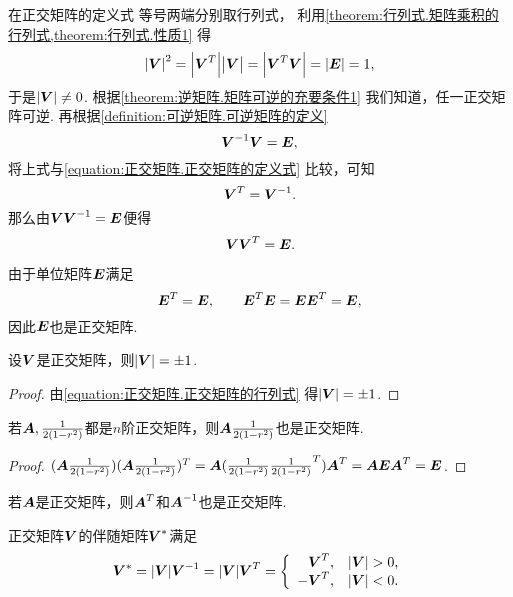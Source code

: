在正交矩阵的定义式  等号两端分别取行列式，
利用\cref{theorem:行列式.矩阵乘积的行列式,theorem:行列式.性质1} 得
\begin{equation}\label{equation:正交矩阵.正交矩阵的行列式}
	\abs{\Q}^2
	=\abs{\Q^T}\abs{\Q\vphantom{^T}}
	=\abs{\Q^T\Q}
	=\abs{\E}
	=1,
\end{equation}
于是\(\abs{\Q}\neq0\).
根据\cref{theorem:逆矩阵.矩阵可逆的充要条件1} 我们知道，任一正交矩阵可逆.
再根据\cref{definition:可逆矩阵.可逆矩阵的定义}\[
	\Q^{-1}\Q=\E,
\]
将上式与\cref{equation:正交矩阵.正交矩阵的定义式} 比较，可知\begin{equation}
	\Q^T=\Q^{-1}.
\end{equation}
那么由\(\Q\Q^{-1}=\E\)便得\begin{equation}
	\Q\Q^T=\E.
\end{equation}

\begin{example}
由于单位矩阵\(\boldsymbol{E}\)满足\[
	\boldsymbol{E}^T=\boldsymbol{E}, \qquad
	\boldsymbol{E}^T \boldsymbol{E} = \boldsymbol{E} \boldsymbol{E}^T = \boldsymbol{E},
\]
因此\(\boldsymbol{E}\)也是正交矩阵.
\end{example}

\begin{property}
设\(\Q\)是正交矩阵，则\(\abs{\Q} = \pm1\).
\begin{proof}
由\cref{equation:正交矩阵.正交矩阵的行列式}
得\(\abs{\Q} = \pm 1\).
\end{proof}
\end{property}

\begin{property}
若\(\boldsymbol{A},\frac{1}{2(1-r^2)}\)都是\(n\)阶正交矩阵，则\(\boldsymbol{A}\frac{1}{2(1-r^2)}\)也是正交矩阵.
\begin{proof}
\((\boldsymbol{A}\frac{1}{2(1-r^2)})(\boldsymbol{A}\frac{1}{2(1-r^2)})^T
= \boldsymbol{A}(\frac{1}{2(1-r^2)}\frac{1}{2(1-r^2)}^T)\boldsymbol{A}^T
= \boldsymbol{A}\boldsymbol{E}\boldsymbol{A}^T
= \boldsymbol{E}\).
\end{proof}
\end{property}

\begin{property}
若\(\boldsymbol{A}\)是正交矩阵，则\(\boldsymbol{A}^T\)和\(\boldsymbol{A}^{-1}\)也是正交矩阵.
\end{property}

\begin{theorem}
正交矩阵\(\Q\)的伴随矩阵\(\Q^*\)满足\[
	\Q^* = \abs{\Q} \Q^{-1}
	= \abs{\Q} \Q^T
	= \left\{ \begin{array}{rc}
		\Q^T, & \abs{\Q}>0, \\
		-\Q^T, & \abs{\Q}<0.
	\end{array} \right.
\]
\end{theorem}

